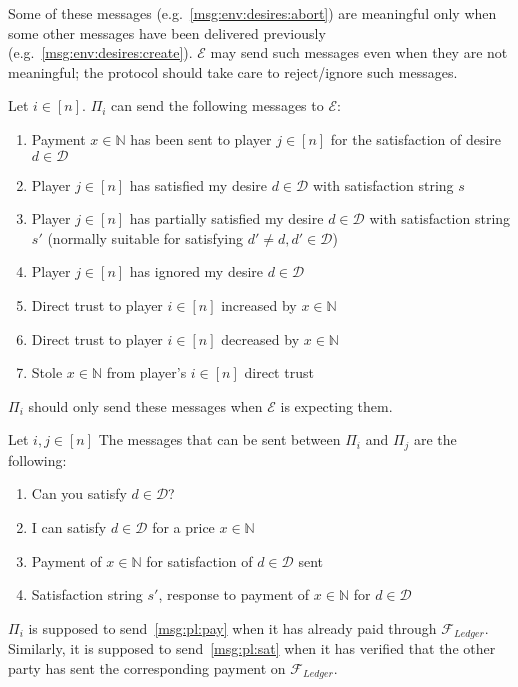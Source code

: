   Some of these messages (e.g.~\ref{msg:env:desires:abort}) are meaningful only when some
  other messages have been delivered previously (e.g.~\ref{msg:env:desires:create}).
  $\mathcal{E}$ may send such messages even when they are not meaningful; the protocol
  should take care to reject/ignore such messages.

  Let $i \in \left[n\right]$. $\Pi_i$ can send the following messages to $\mathcal{E}$:
  \begin{enumerate}
    \item Payment $x \in \mathbb{N}$ has been sent to player $j \in \left[n\right]$ for
    the satisfaction of desire $d \in \mathcal{D}$
    \item Player $j \in \left[n\right]$ has satisfied my desire $d \in \mathcal{D}$ with
    satisfaction string $s$
    \item Player $j \in \left[n\right]$ has partially satisfied my desire $d \in
    \mathcal{D}$ with satisfaction string $s'$ (normally suitable for satisfying $d' \neq
    d, d' \in \mathcal{D}$)
    \item Player $j \in \left[n\right]$ has ignored my desire $d \in \mathcal{D}$
    \item Direct trust to player $i \in \left[n\right]$ increased by $x \in \mathbb{N}$
    \item Direct trust to player $i \in \left[n\right]$ decreased by $x \in \mathbb{N}$
    \item Stole $x \in \mathbb{N}$ from player's $i \in \left[n\right]$ direct trust
  \end{enumerate}
  $\Pi_i$ should only send these messages when $\mathcal{E}$ is expecting them.

  Let $i, j \in \left[n\right]$ The messages that can be sent between $\Pi_i$ and $\Pi_j$
  are the following:
  \begin{enumerate}
    \item Can you satisfy $d \in \mathcal{D}$?
    \item I can satisfy $d \in \mathcal{D}$ for a price $x \in \mathbb{N}$
    \item \label{msg:pl:pay} Payment of $x \in \mathbb{N}$ for satisfaction of $d \in \mathcal{D}$ sent
    \item \label{msg:pl:sat} Satisfaction string $s'$, response to payment of $x \in \mathbb{N}$ for $d \in
    \mathcal{D}$
  \end{enumerate}
  $\Pi_i$ is supposed to send~\ref{msg:pl:pay} when it has already paid through
  $\mathcal{F}_{Ledger}$. Similarly, it is supposed to send~\ref{msg:pl:sat} when it has
  verified that the other party has sent the corresponding payment on
  $\mathcal{F}_{Ledger}$.
